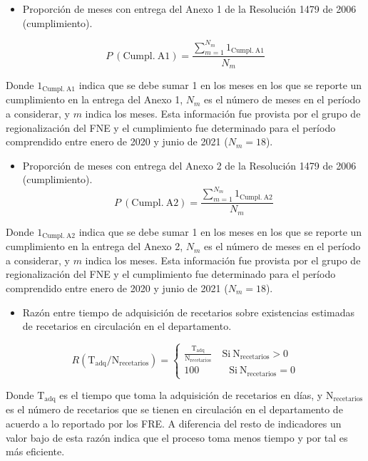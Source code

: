 \documentclass[
  oneside]{book}
\providecommand{\tightlist}{%
  \setlength{\itemsep}{0pt}\setlength{\parskip}{0pt}}
\begin{document}
\begin{itemize}
\tightlist
\item
  Proporción de meses con entrega del Anexo 1 de la Resolución 1479 de 2006 (cumplimiento).
\end{itemize}

\[P~\left( \mathrm{Cumpl.~A1}\right) = \frac{\sum^{N_m}_{m = 1}{1_{\mathrm{Cumpl.~A1}}}}{N_m}\]

Donde \(1_{\mathrm{Cumpl.~A1}}\) indica que se debe sumar 1 en los meses en los que se reporte un cumplimiento en la entrega del Anexo 1, \(N_m\) es el número de meses en el período a considerar, y \(m\) indica los meses. Esta información fue provista por el grupo de regionalización del FNE y el cumplimiento fue determinado para el período comprendido entre enero de 2020 y junio de 2021 (\(N_m = 18\)).

\begin{itemize}
\tightlist
\item
  Proporción de meses con entrega del Anexo 2 de la Resolución 1479 de 2006 (cumplimiento).
  \[P~\left( \mathrm{Cumpl.~A2}\right) = \frac{\sum^{N_m}_{m = 1}{1_{\mathrm{Cumpl.~A2}}}}{N_m}\]
\end{itemize}

Donde \(1_{\mathrm{Cumpl.~A2}}\) indica que se debe sumar 1 en los meses en los que se reporte un cumplimiento en la entrega del Anexo 2, \(N_m\) es el número de meses en el período a considerar, y \(m\) indica los meses. Esta información fue provista por el grupo de regionalización del FNE y el cumplimiento fue determinado para el período comprendido entre enero de 2020 y junio de 2021 (\(N_m = 18\)).

\begin{itemize}
\tightlist
\item
  Razón entre tiempo de adquisición de recetarios sobre existencias estimadas de recetarios en circulación en el departamento.
\end{itemize}

\[R \left(\mathrm{T_{adq}}/\mathrm{N_{recetarios}}\right ) = \left\{\begin{matrix}
\frac{\mathrm{T_{adq}}}{\mathrm{N_{recetarios}}}\quad\mathrm{Si}~\mathrm{N_{recetarios}}>0
\\ 100\quad\quad\quad\mathrm{Si}~\mathrm{N_{recetarios}}=0
\end{matrix}\right.
\]

Donde \(\mathrm{T_{adq}}\) es el tiempo que toma la adquisición de recetarios en días, y \(\mathrm{N_{recetarios}}\) es el número de recetarios que se tienen en circulación en el departamento de acuerdo a lo reportado por los FRE. A diferencia del resto de indicadores un valor bajo de esta razón indica que el proceso toma menos tiempo y por tal es más eficiente.
\end{document}
